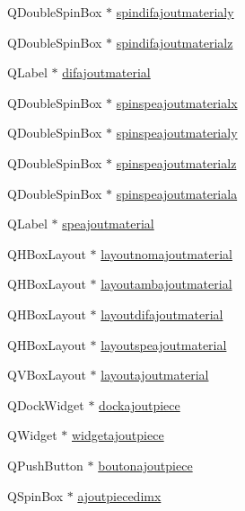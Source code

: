 \begin{DoxyCompactItemize}
\item 
Q\+Double\+Spin\+Box $\ast$ \hyperlink{class_main_window_ac8938b333422d475686212a6da6f8592}{spindifajoutmaterialy}
\item 
Q\+Double\+Spin\+Box $\ast$ \hyperlink{class_main_window_adbf1bc80b252c00419abec7da5e19913}{spindifajoutmaterialz}
\item 
Q\+Label $\ast$ \hyperlink{class_main_window_a8bbcda89f3ac6367c000056b7e6acb5f}{difajoutmaterial}
\item 
Q\+Double\+Spin\+Box $\ast$ \hyperlink{class_main_window_a41b46a41873912e43f60feafeec48f2f}{spinspeajoutmaterialx}
\item 
Q\+Double\+Spin\+Box $\ast$ \hyperlink{class_main_window_af5f3e81215640c685afbe36ea30926eb}{spinspeajoutmaterialy}
\item 
Q\+Double\+Spin\+Box $\ast$ \hyperlink{class_main_window_abfa1370458910b22754b3a2f9dcf8079}{spinspeajoutmaterialz}
\item 
Q\+Double\+Spin\+Box $\ast$ \hyperlink{class_main_window_ada80e183d94aca69af5b4b413b283a41}{spinspeajoutmateriala}
\item 
Q\+Label $\ast$ \hyperlink{class_main_window_a464561ddbc54d9ced72ad2e1bd76c582}{speajoutmaterial}
\item 
Q\+H\+Box\+Layout $\ast$ \hyperlink{class_main_window_adf5b4cec63e1fb74cfa99d9ff9e72b8d}{layoutnomajoutmaterial}
\item 
Q\+H\+Box\+Layout $\ast$ \hyperlink{class_main_window_ac7c260f905c9235339c200e7fa4e6258}{layoutambajoutmaterial}
\item 
Q\+H\+Box\+Layout $\ast$ \hyperlink{class_main_window_acf1014fb28677dc578d33bf3c4b8729b}{layoutdifajoutmaterial}
\item 
Q\+H\+Box\+Layout $\ast$ \hyperlink{class_main_window_adac5730b1a8e83ec6c59d531d9f7ba4e}{layoutspeajoutmaterial}
\item 
Q\+V\+Box\+Layout $\ast$ \hyperlink{class_main_window_a377ec350ecc66336f8d5540670999b3a}{layoutajoutmaterial}
\item 
Q\+Dock\+Widget $\ast$ \hyperlink{class_main_window_a6a303ea101c20af7884bb398bd3dc41f}{dockajoutpiece}
\item 
Q\+Widget $\ast$ \hyperlink{class_main_window_a81a3c7e272f0bc32762ef85575fe271d}{widgetajoutpiece}
\item 
Q\+Push\+Button $\ast$ \hyperlink{class_main_window_ad6c5d4342e58b7edad16490d493ea342}{boutonajoutpiece}
\item 
Q\+Spin\+Box $\ast$ \hyperlink{class_main_window_aa75a74b6d22f3363190785617dba7dc2}{ajoutpiecedimx}

\end{DoxyCompactItemize}
